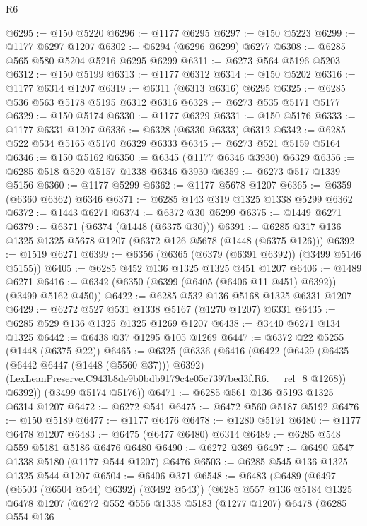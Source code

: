 \begin{lexlean}{R6}
\begin{coremodule}
@6295 := @150 @5220
@6296 := @1177 @6295
@6297 := @150 @5223
@6299 := @1177 @6297 @1207
@6302 := @6294 (@6296 @6299) @6277
@6308 := @6285 @565 @580 @5204 @5216 @6295 @6299
@6311 := @6273 @564 @5196 @5203
@6312 := @150 @5199
@6313 := @1177 @6312
@6314 := @150 @5202
@6316 := @1177 @6314 @1207
@6319 := @6311 (@6313 @6316) @6295
@6325 := @6285 @536 @563 @5178 @5195 @6312 @6316
@6328 := @6273 @535 @5171 @5177
@6329 := @150 @5174
@6330 := @1177 @6329
@6331 := @150 @5176
@6333 := @1177 @6331 @1207
@6336 := @6328 (@6330 @6333) @6312
@6342 := @6285 @522 @534 @5165 @5170 @6329 @6333
@6345 := @6273 @521 @5159 @5164
@6346 := @150 @5162
@6350 := @6345 (@1177 @6346 @3930) @6329
@6356 := @6285 @518 @520 @5157 @1338 @6346 @3930
@6359 := @6273 @517 @1339 @5156
@6360 := @1177 @5299
@6362 := @1177 @5678 @1207
@6365 := @6359 (@6360 @6362) @6346
@6371 := @6285 @143 @319 @1325 @1338 @5299 @6362
@6372 := @1443 @6271
@6374 := @6372 @30 @5299
@6375 := @1449 @6271
@6379 := @6371 (@6374 (@1448 (@6375 @30)))
@6391 := @6285 @317 @136 @1325 @1325 @5678 @1207 (@6372 @126 @5678 (@1448 (@6375 @126)))
@6392 := @1519 @6271
@6399 := @6356 (@6365 (@6379 (@6391 @6392)) (@3499 @5146 @5155))
@6405 := @6285 @452 @136 @1325 @1325 @451 @1207
@6406 := @1489 @6271
@6416 := @6342 (@6350 (@6399 (@6405 (@6406 @11 @451) @6392)) (@3499 @5162 @450))
@6422 := @6285 @532 @136 @5168 @1325 @6331 @1207
@6429 := @6272 @527 @531 @1338 @5167 (@1270 @1207) @6331
@6435 := @6285 @529 @136 @1325 @1325 @1269 @1207
@6438 := @3440 @6271 @134 @1325
@6442 := @6438 @37 @1295 @105 @1269
@6447 := @6372 @22 @5255 (@1448 (@6375 @22))
@6465 := @6325
    (@6336
      (@6416
        (@6422
          (@6429
            (@6435 (@6442 @6447 (@1448 (@5560 @37))) @6392)
            (LexLeanPreserve.C943b8de9b0bdb9179c4e05c7397bed3f.R6.__rel_8 @1268))
          @6392))
      (@3499 @5174 @5176))
@6471 := @6285 @561 @136 @5193 @1325 @6314 @1207
@6472 := @6272 @541
@6475 := @6472 @560 @5187 @5192
@6476 := @150 @5189
@6477 := @1177 @6476
@6478 := @1280 @5191
@6480 := @1177 @6478 @1207
@6483 := @6475 (@6477 @6480) @6314
@6489 := @6285 @548 @559 @5181 @5186 @6476 @6480
@6490 := @6272 @369
@6497 := @6490 @547 @1338 @5180 (@1177 @544 @1207) @6476
@6503 := @6285 @545 @136 @1325 @1325 @544 @1207
@6504 := @6406 @371
@6548 := @6483
    (@6489
      (@6497 (@6503 (@6504 @544) @6392) (@3492 @543))
      (@6285
        @557
        @136
        @5184
        @1325
        @6478
        @1207
        (@6272
          @552
          @556
          @1338
          @5183
          (@1277 @1207)
          @6478
          (@6285
            @554
            @136

\end{coremodule}
\end{lexlean}
